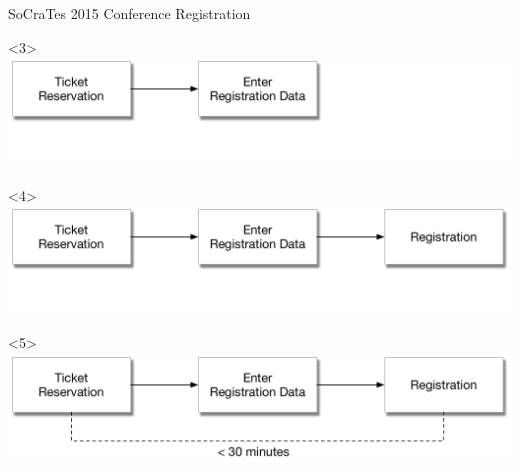 \begin{frame}[fragile]{SoCraTes 2015 Conference Registration}
\begin{onlyenv}<3>
\includegraphics[width=\textwidth]{../Registration2.pdf}
\end{onlyenv}

\begin{onlyenv}<4>
\includegraphics[width=\textwidth]{../Registration3.pdf}
\end{onlyenv}

\begin{onlyenv}<5>
\includegraphics[width=\textwidth]{../Registration4.pdf}
\end{onlyenv}

\end{frame}

